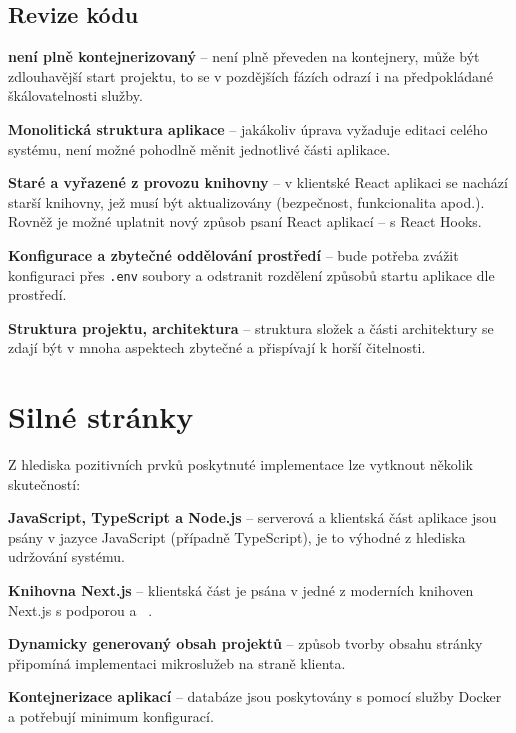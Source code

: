 \subsection{Revize kódu}

\begin{ul}
   \item
   \textbf{ není plně kontejnerizovaný} –  není plně převeden na kontejnery, může být zdlouhavější start projektu, to se v pozdějších fázích odrazí i na předpokládané škálovatelnosti služby.

   \item
   \textbf{Monolitická struktura aplikace} – jakákoliv úprava vyžaduje editaci celého systému, není možné pohodlně měnit jednotlivé části aplikace.

   \item
   \textbf{Staré a vyřazené z provozu knihovny} – v klientské React aplikaci se nachází starší knihovny, jež musí být aktualizovány (bezpečnost, funkcionalita apod.).
   Rovněž je možné uplatnit nový způsob psaní React aplikací – s React Hooks.

   \item
   \textbf{Konfigurace a zbytečné oddělování prostředí} – bude potřeba zvážit konfiguraci přes \texttt{.env} soubory a odstranit rozdělení způsobů startu aplikace dle prostředí.

   \item
   \textbf{Struktura projektu, architektura} – struktura složek a části architektury se zdají být v mnoha aspektech zbytečné a přispívají k horší čitelnosti.
\end{ul}



\section{Silné stránky}
Z hlediska pozitivních prvků poskytnuté implementace lze vytknout několik skutečností:

\begin{ul}
   \item
   \textbf{JavaScript, TypeScript a Node.js} – serverová a klientská část aplikace jsou psány v jazyce JavaScript (případně TypeScript), je to výhodné z hlediska udržování systému.

   \item
   \textbf{Knihovna Next.js} – klientská část je psána v jedné z moderních knihoven Next.js s podporou  a ~\cite{nextjs}.

   \item
   \textbf{Dynamicky generovaný obsah projektů} – způsob tvorby obsahu stránky připomíná implementaci mikroslužeb na straně klienta.

   \item
   \textbf{Kontejnerizace aplikací} – databáze jsou poskytovány s pomocí služby Docker a potřebují minimum konfigurací.
\end{ul}



